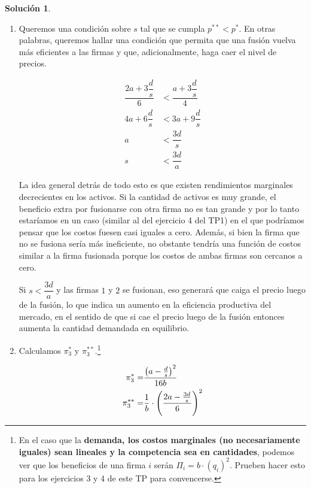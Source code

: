 \documentclass[a4paper, 11pt]{article}
\theoremstyle{definition}
\newtheorem{solucion}{Soluci\'on}
\begin{document}
\begin{solucion}
\begin{enumerate}
\begin{enumerate}
\item
Queremos una condición sobre $s$ tal que se cumpla $p^{**}<p^*$. En otras palabras, queremos hallar una condición que permita que una fusión vuelva más eficientes a las firmas y que, adicionalmente, haga caer el nivel de precios.

\vspace*{-32pt}
\begin{align*}
\dfrac{2a+3\dfrac{d}{s}}{6}&<\dfrac{a+3\dfrac{d}{s}}{4}\\
4a+6\dfrac{d}{s}&<3a+9\dfrac{d}{s}\\
a&<\dfrac{3d}{s}\\
s&<\dfrac{3d}{a}
\end{align*}

La idea general detrás de todo esto es que existen rendimientos marginales decrecientes en los activos. Si la cantidad de activos es muy grande, el beneficio extra por fusionarse con otra firma no es tan grande y por lo tanto estaríamos en un caso (similar al del ejercicio 4 del TP1) en el que podríamos pensar que los costos fuesen casi iguales a cero. Además, si bien la firma que no se fusiona sería más ineficiente, no obstante tendría una función de costos similar a la firma fusionada porque los costos de ambas firmas son cercanos a cero.

Si $s<\dfrac{3d}{a}$ y las firmas $1$ y $2$ se fusionan, eso generará que caiga el precio luego de la fusión, lo que indica un aumento en la eficiencia productiva del mercado, en el sentido de que si cae el precio luego de la fusión entonces aumenta la cantidad demandada en equilibrio.

\item
Calculamos $\pi_3^*$ y $\pi_3^{**}$.\footnote{En el caso que la\textbf{ demanda, los costos marginales (no necesariamente iguales) sean lineales y la competencia sea en cantidades}, podemos ver que los beneficios de una firma $i$ serán $\Pi_i=b\cdot(q_i)^2$. Prueben hacer esto para los ejercicios 3 y 4 de este TP para convencerse.}

\vspace*{-20pt}

\begin{align*}
\pi_3^*=&\dfrac{\left(a-\frac{d}{s}\right)^2}{16b}\vspace{3pt}\\
\pi_3^{**}=&\dfrac{1}{b}\cdot \left(\dfrac{2a-\frac{3d}{s}}{6}\right)^2
\end{align*}

\vspace*{-16pt}


\end{enumerate}
\end{enumerate}
\end{solucion}
\end{document}
